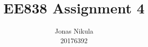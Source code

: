 \documentclass{article}
\title{EE838 Assignment 4} %
\author{Jonas Nikula \\ 20176392} %
\date{} %
\begin{document}
\maketitle %





\printbibliography{}

\end{document}
